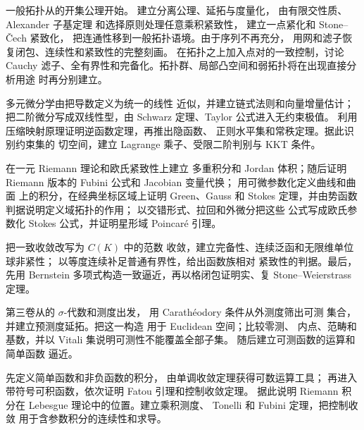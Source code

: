 一般拓扑从的开集公理开始。
建立分离公理、延拓与度量化，
由有限交性质、Alexander 子基定理
和选择原则处理任意乘积紧致性，
建立一点紧化和 Stone--Čech 紧致化，
把连通性移到一般拓扑语境。由于序列不再充分，
用网和滤子恢复闭包、连续性和紧致性的完整刻画。
在拓扑之上加入点对的一致控制，讨论 Cauchy
滤子、全有界性和完备化。拓扑群、局部凸空间和弱拓扑将在出现直接分析用途
时再分别建立。

多元微分学由把导数定义为统一的线性
近似，并建立链式法则和向量增量估计；
把二阶微分写成双线性型，由 Schwarz 定理、Taylor 公式进入无约束极值。
利用压缩映射原理证明逆函数定理，再推出隐函数、
正则水平集和常秩定理。据此识别约束集的
切空间，建立 Lagrange 乘子、受限二阶判别与 KKT 条件。

在一元 Riemann 理论和欧氏紧致性上建立
多重积分和 Jordan 体积；随后证明
Riemann 版本的 Fubini 公式和 Jacobian 变量代换；
用可微参数化定义曲线和曲面
上的积分，在经典坐标区域上证明 Green、Gauss 和 Stokes 定理，并由势函数
判据说明定义域拓扑的作用；
以交错形式、拉回和外微分把这些
公式写成欧氏参数化 Stokes 公式，并证明星形域 Poincaré 引理。

把一致收敛改写为 $C(K)$ 中的范数
收敛，建立完备性、连续泛函和无限维单位球非紧性；
以等度连续补足普通有界性，给出函数族相对
紧致性的判据。最后，先用 Bernstein
多项式构造一致逼近，再以格闭包证明实、复 Stone--Weierstrass 定理。

第三卷从的 \(\sigma\)-代数和测度出发，
用 Carathéodory 条件从外测度筛出可测
集合，并建立预测度延拓。把这一构造
用于 Euclidean 空间；比较零测、
内点、范畴和基数，并以 Vitali 集说明可测性不能覆盖全部子集。
随后建立可测函数的运算和简单函数
逼近。

先定义简单函数和非负函数的积分，
由单调收敛定理获得可数运算工具；
再进入带符号可积函数，依次证明 Fatou 引理和控制收敛定理。
据此说明 Riemann 积分在
Lebesgue 理论中的位置。建立乘积测度、
Tonelli 和 Fubini 定理，把控制收敛
用于含参数积分的连续性和求导。

